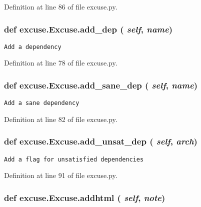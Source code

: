 Definition at line 86 of file excuse.py.
\subsubsection{\setlength{\rightskip}{0pt plus 5cm}def excuse.Excuse.add\_\-dep ( {\em self},  {\em name})}\label{classexcuse_1_1Excuse_fa97c9f61fef17d6028491362153a766}




\footnotesize\begin{verbatim}Add a dependency\end{verbatim}
\normalsize
 

Definition at line 78 of file excuse.py.
\subsubsection{\setlength{\rightskip}{0pt plus 5cm}def excuse.Excuse.add\_\-sane\_\-dep ( {\em self},  {\em name})}\label{classexcuse_1_1Excuse_8a89f54df8036e6f5c7c6bfa3f0cc6fc}




\footnotesize\begin{verbatim}Add a sane dependency\end{verbatim}
\normalsize
 

Definition at line 82 of file excuse.py.
\subsubsection{\setlength{\rightskip}{0pt plus 5cm}def excuse.Excuse.add\_\-unsat\_\-dep ( {\em self},  {\em arch})}\label{classexcuse_1_1Excuse_7c76b47749dc3da2b1988a6991664a40}




\footnotesize\begin{verbatim}Add a flag for unsatisfied dependencies\end{verbatim}
\normalsize
 

Definition at line 91 of file excuse.py.
\subsubsection{\setlength{\rightskip}{0pt plus 5cm}def excuse.Excuse.addhtml ( {\em self},  {\em note})}\label{classexcuse_1_1Excuse_eb0a1ea0fae66a571e5efa703e53ba3a}




